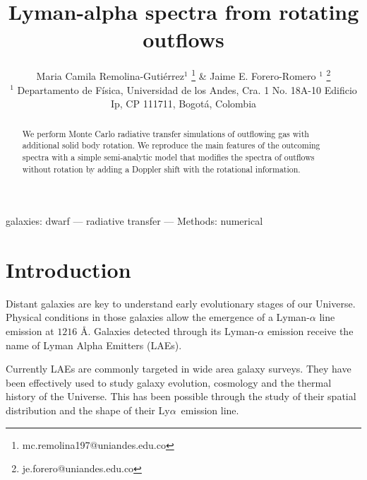 \documentclass[a4paper,fleqn,usenatbib]{mnras}
\newcommand{\lya}{\ifmmode{{\rm Ly}\alpha}\else Ly$\alpha$\ \fi}
\begin{document}
\title[Outflows and rotation in LAEs]{Lyman-alpha spectra from rotating outflows}
\author[M.C. Remolina-Gutierrez \& J.E. Forero-Romero]{
  Maria Camila Remolina-Guti\'errez$^{1}$ 
  \thanks{mc.remolina197@uniandes.edu.co} \&
  Jaime E. Forero-Romero $^{1}$ 
  \thanks{je.forero@uniandes.edu.co}\\
  $^{1}$ Departamento de F\'isica, Universidad de los Andes, Cra. 1
  No. 18A-10 Edificio Ip, CP 111711, Bogot\'a, Colombia \\
}

\maketitle
      
\begin{abstract}
We perform Monte Carlo radiative transfer simulations of outflowing
gas with additional solid body rotation.
We reproduce the main features of the outcoming spectra with a simple
semi-analytic model that modifies the spectra of outflows without
rotation by adding a Doppler shift with the rotational information.

\end{abstract}

\begin{keywords}
galaxies: dwarf --- radiative transfer --- Methods: numerical 
\end{keywords}




\section{Introduction}
\label{sec:intro}

Distant galaxies are key to understand early evolutionary stages of
our Universe.
Physical conditions in those galaxies allow the emergence of a
Lyman-$\alpha$ line emission at $1216$ \AA \citep{PartridgePeebles}.
Galaxies detected through its Lyman-$\alpha$ emission receive the name of
Lyman Alpha Emitters (LAEs).

Currently LAEs are commonly targeted in wide area galaxy surveys.
They have been effectively used to study galaxy evolution,
cosmology and the thermal history of the Universe.
This has been possible through the study of their spatial distribution and
the shape of their \lya emission line.
\end{document}

